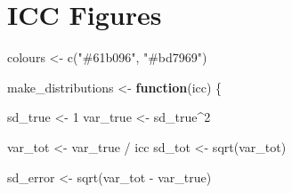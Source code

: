 \documentclass[
]{article}
\newenvironment{Shaded}{\begin{snugshade}}{\end{snugshade}}
\newcommand{\ControlFlowTok}[1]{\textcolor[rgb]{0.13,0.29,0.53}{\textbf{#1}}}
\newcommand{\DecValTok}[1]{\textcolor[rgb]{0.00,0.00,0.81}{#1}}
\newcommand{\FunctionTok}[1]{\textcolor[rgb]{0.00,0.00,0.00}{#1}}
\newcommand{\NormalTok}[1]{#1}
\newcommand{\OtherTok}[1]{\textcolor[rgb]{0.56,0.35,0.01}{#1}}
\newcommand{\SpecialCharTok}[1]{\textcolor[rgb]{0.00,0.00,0.00}{#1}}
\newcommand{\StringTok}[1]{\textcolor[rgb]{0.31,0.60,0.02}{#1}}
\begin{document}
\hypertarget{icc-figures}{%
\section{ICC Figures}\label{icc-figures}}

\begin{Shaded}
\begin{Highlighting}[]
\NormalTok{colours }\OtherTok{\textless{}{-}} \FunctionTok{c}\NormalTok{(}\StringTok{"\#61b096"}\NormalTok{, }\StringTok{"\#bd7969"}\NormalTok{)}

\NormalTok{make\_distributions }\OtherTok{\textless{}{-}} \ControlFlowTok{function}\NormalTok{(icc) \{}
  
\NormalTok{  sd\_true }\OtherTok{\textless{}{-}} \DecValTok{1}
\NormalTok{  var\_true }\OtherTok{\textless{}{-}}\NormalTok{ sd\_true}\SpecialCharTok{\^{}}\DecValTok{2}
  
\NormalTok{  var\_tot }\OtherTok{\textless{}{-}}\NormalTok{ var\_true }\SpecialCharTok{/}\NormalTok{ icc}
\NormalTok{  sd\_tot }\OtherTok{\textless{}{-}} \FunctionTok{sqrt}\NormalTok{(var\_tot)}
  
\NormalTok{  sd\_error }\OtherTok{\textless{}{-}} \FunctionTok{sqrt}\NormalTok{(var\_tot }\SpecialCharTok{{-}}\NormalTok{ var\_true)}
  

\end{Highlighting}
\end{Shaded}
\end{document}
